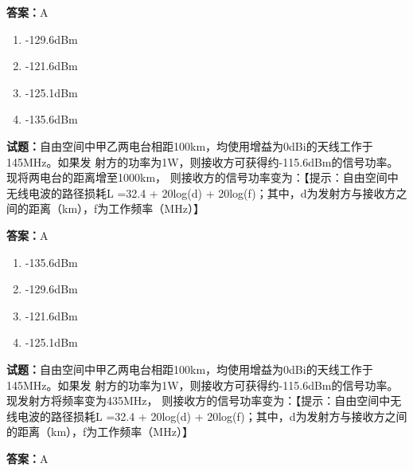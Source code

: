 \documentclass{ctexbook}
\begin{document}
\textbf{答案：}A 

\begin{enumerate}[leftmargin=3em]
  \item -129.6dBm 

  \item -121.6dBm 

  \item -125.1dBm 

  \item -135.6dBm 

\end{enumerate}






\vspace{1em}

\textbf{试题：}自由空间中甲乙两电台相距100km，均使用增益为0dBi的天线工作于145MHz。如果发
射方的功率为1W，则接收方可获得约-115.6dBm的信号功率。现将两电台的距离增至1000km，
则接收方的信号功率变为：【提示：自由空间中无线电波的路径损耗L =32.4 + 20log(d) + 
20log(f)；其中，d为发射方与接收方之间的距离（km），f为工作频率（MHz）】 

\textbf{答案：}A 

\begin{enumerate}[leftmargin=3em]
  \item -135.6dBm 

  \item -129.6dBm 

  \item -121.6dBm 

  \item -125.1dBm 

\end{enumerate}





\vspace{1em}

\textbf{试题：}自由空间中甲乙两电台相距100km，均使用增益为0dBi的天线工作于145MHz。如果发
射方的功率为1W，则接收方可获得约-115.6dBm的信号功率。现发射方将频率变为435MHz，
则接收方的信号功率变为：【提示：自由空间中无线电波的路径损耗L =32.4 + 20log(d) + 
20log(f)；其中，d为发射方与接收方之间的距离（km），f为工作频率（MHz）】 

\textbf{答案：}A 
\end{document}

